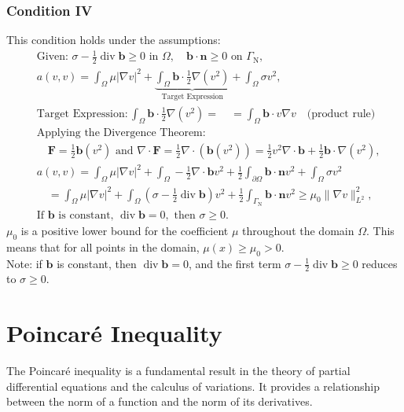 \documentclass[11pt]{book}
\begin{document}
\subsubsection*{Condition IV} 
This condition holds under the assumptions:
\[
\begin{aligned}
& \text{Given: } \sigma-\frac{1}{2} \operatorname{div} \mathbf{b} \geq 0 \text{ in } \Omega, \quad \mathbf{b} \cdot \mathbf{n} \geq 0 \text{ on } \Gamma_{\mathrm{N}}, \\
& a(v, v) = \int_{\Omega} \mu|\nabla v|^2 + \underbrace{\int_{\Omega} \mathbf{b} \cdot \frac{1}{2} \nabla(v^2)}_{\text{Target Expression}} + \int_{\Omega} \sigma v^2, \\
& \text{Target Expression}:  \int_{\Omega} \mathbf{b} \cdot \frac{1}{2} \nabla(v^2) =
\quad = \int_{\Omega} \mathbf{b} \cdot v\nabla v \quad \text{(product rule)} \\
& \text{Applying the Divergence Theorem:} \\
& \quad \mathbf{F} = \frac{1}{2} \mathbf{b}(v^2) \text{ and } \nabla \cdot \mathbf{F} = \frac{1}{2} \nabla \cdot (\mathbf{b}(v^2)) = \frac{1}{2}v^2 \nabla \cdot \mathbf{b} + \frac{1}{2} \mathbf{b} \cdot \nabla(v^2), \\
& a(v, v) = \int_{\Omega} \mu|\nabla v|^2 + \int_{\Omega} -\frac{1}{2} \nabla \cdot \mathbf{b}v^2 + \frac{1}{2} \int_{\partial \Omega} \mathbf{b} \cdot \mathbf{n} v^2 + \int_{\Omega} \sigma v^2 \\
& \quad = \int_{\Omega} \mu|\nabla v|^2 + \int_{\Omega}\left(\sigma-\frac{1}{2} \operatorname{div} \mathbf{b}\right) v^2 + \frac{1}{2} \int_{\Gamma_{\mathrm{N}}} \mathbf{b} \cdot \mathbf{n} v^2 \geq \mu_0\|\nabla v\|_{L^2}^2, \\
& \text{If } \mathbf{b} \text{ is constant, } \operatorname{div} \mathbf{b} = 0, \text{ then } \sigma \geq 0.
\end{aligned}
\]
\(\mu_0\) is a positive lower bound for the coefficient \(\mu\) throughout the domain \(\Omega\). This means that for all points in the domain, \(\mu(x) \geq \mu_0 > 0\). \\

Note: if $\mathbf{b}$ is constant, then $\operatorname{div} \mathbf{b}=0$, and the first term $\sigma-\frac{1}{2} \operatorname{div} \mathbf{b} \geq 0$ reduces to $\sigma \geq 0$.

\section{Poincaré Inequality}
The Poincaré inequality is a fundamental result in the theory of partial differential equations and the calculus of variations. It provides a relationship between the norm of a function and the norm of its derivatives.\\   
\end{document}

